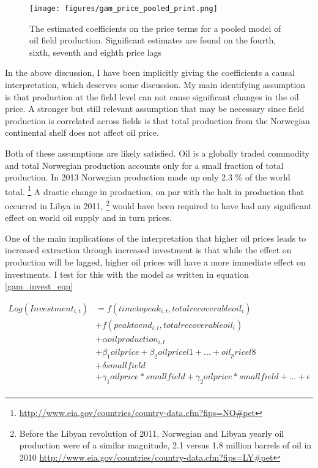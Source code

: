 \documentclass[11pt]{article}
\begin{document}
\begin{figure}
	\texttt{[image: figures/gam\_price\_pooled\_print.png]}
	\caption{The estimated coefficients on the price terms for a pooled model of oil field production.  Significant estimates are found on the fourth, sixth, seventh and eighth price lags}
	\label{gam_price_pooled}
\end{figure}

In the above discussion, I have been implicitly giving the coefficients a causal interpretation, which deserves some discussion.  My main identifying assumption is that production at the field level can not cause significant changes in the oil price.  A stronger but still relevant assumption that may be necessary since field production is correlated across fields is that total production from the Norwegian continental shelf does not affect oil price.  

Both of these assumptions are likely satisfied.  Oil is a globally traded commodity and total Norwegian production accounts only for a small fraction of total production.  In 2013 Norwegian production made up only 2.3 \% of the world total. \footnote{\url{http://www.eia.gov/countries/country-data.cfm?fips=NO#pet}}  A drastic change in production, on par with the halt in production that occurred in Libya in 2011, \footnote{Before the Libyan revolution of 2011, Norwegian and Libyan yearly oil production were of a similar magnitude, 2.1 versus 1.8 million barrels of oil in 2010 \url{http://www.eia.gov/countries/country-data.cfm?fips=LY#pet}} would have been required to have had any significant effect on world oil supply and in turn prices. 

One of the main implications of the interpretation that higher oil prices leads to increased extraction through increased investment is that while the effect on production will be lagged, higher oil prices will have a more immediate effect on investments.  I test for this with the model as written in equation \ref{gam_invest_eqn}

\begin{equation}
\begin{split}
	Log(Investment_{i,t})&=f(timetopeak_{i,t}, totalrecoverableoil_i) \\
	 \quad &+ f(peaktoend_{i,t}, totalrecoverableoil_i) \\
	 \quad &+ \alpha oilproduction_{i,t} \\
	 \quad & + \beta_1 oilprice + \beta_2 oilpricel1 + ... + oil_pricel8 \\
	 \quad &+ \delta smallfield \\
	 \quad &+ \gamma_1 oilprice*smallfield + \gamma_2 oilprice*smallfield + ... 
	+  \epsilon \\
\label{gam_invest_eqn}
\end{split}
\end{equation}
\end{document}
